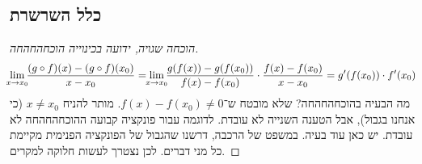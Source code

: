 \documentclass[name=רשימות חשבון דיפרנציאלי ואינטגרלי 1א]{../../../tex/classes/megasumPreamble}
\newcommand\tfl     {\lim_{\mathclap{x \to x_0}}}
\begin{document}
	\subsection{כלל השרשרת}
	\begin{proof}[הוכחה שגויה, ידועה בכינוייה הוכחהחהחה]
		\[ \tfl \frac{(g \circ f)(x) - (g \circ f)(x_0)}{x - x_0} = \tfl \frac{g(f(x)) - g(f(x_0))}{f(x) - f(x_0)} \cdot \frac{f(x) - f(x_0)}{x - x_0} = g'(f(x_0)) \cdot f'(x_0) \]
		מה הבעיה בהוכחהחהחה? שלא מובטח ש־$f(x) - f(x_0) \neq 0$. מותר להניח $x \neq x_0$ (כי אנחנו בגבול), אבל הטענה השנייה לא עובדת. לדוגמה עבור פונקציה קבועה ההוכחהחהחה לא עובדת. יש כאן עוד בעיה. במשפט של הרכבה, דרשנו שהגבול של הפונקציה הפנימית מקיימת כל מני דברים. לכן נצטרך לעשות חלוקה למקרים.
	\end{proof}
\end{document}
